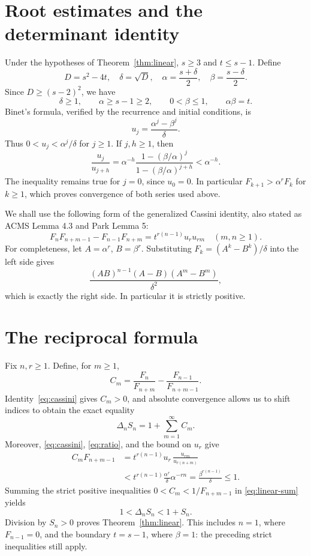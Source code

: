 \documentclass[11pt]{article}
\begin{document}
\section*{Root estimates and the determinant identity}
Under the hypotheses of Theorem~\ref{thm:linear}, $s\geq3$ and
$t\leq s-1$. Define
\[
D=s^2-4t,\quad \delta=\sqrt D,\quad
\alpha=\frac{s+\delta}{2},\quad \beta=\frac{s-\delta}{2}.
\]
Since $D\geq(s-2)^2$, we have
\[
\delta\geq1,\qquad \alpha\geq s-1\geq2,\qquad
0<\beta\leq1,\qquad \alpha\beta=t.
\]
Binet's formula, verified by the recurrence and initial conditions, is
\[
u_j=\frac{\alpha^j-\beta^j}{\delta}.
\]
Thus $0<u_j<\alpha^j/\delta$ for $j\geq1$. If $j,h\geq1$, then
\begin{equation}\label{eq:ratio}
\frac{u_j}{u_{j+h}}
=\alpha^{-h}\frac{1-(\beta/\alpha)^j}
 {1-(\beta/\alpha)^{j+h}}<\alpha^{-h}.
\end{equation}
The inequality remains true for $j=0$, since $u_0=0$.
In particular $F_{k+1}>\alpha^r F_k$ for $k\geq1$,
which proves convergence of both series used above.

We shall use the following form of the generalized Cassini identity,
also stated as ACMS Lemma 4.3 and Park Lemma 5:
\begin{equation}\label{eq:cassini}
F_nF_{n+m-1}-F_{n-1}F_{n+m}
=t^{r(n-1)}u_r u_{rm}\quad(m,n\geq1).
\end{equation}
For completeness, let $A=\alpha^r$, $B=\beta^r$. Substituting
$F_k=(A^k-B^k)/\delta$ into the left side gives
\[
\frac{(AB)^{n-1}(A-B)(A^m-B^m)}{\delta^2},
\]
which is exactly the right side. In particular it is strictly positive.

\section*{The reciprocal formula}
Fix $n,r\geq1$. Define, for $m\geq1$,
\[
C_m=\frac{F_n}{F_{n+m}}-\frac{F_{n-1}}{F_{n+m-1}}.
\]
Identity~\eqref{eq:cassini} gives $C_m>0$, and absolute convergence
allows us to shift indices to obtain the exact equality
\begin{equation}\label{eq:linear-sum}
\Delta_n S_n=1+\sum_{m=1}^{\infty}C_m .
\end{equation}
Moreover, \eqref{eq:cassini}, \eqref{eq:ratio}, and the bound on $u_r$
give
\begin{align*}
C_mF_{n+m-1}
&=t^{r(n-1)}u_r\,\frac{u_{rm}}{u_{r(n+m)}}\\
&<t^{r(n-1)}\frac{\alpha^r}{\delta}\alpha^{-rn}
=\frac{\beta^{r(n-1)}}{\delta}\leq1.
\end{align*}
Summing the strict positive inequalities
$0<C_m<1/F_{n+m-1}$ in \eqref{eq:linear-sum} yields
\[
1<\Delta_n S_n<1+S_n.
\]
Division by $S_n>0$ proves Theorem~\ref{thm:linear}. This includes
$n=1$, where $F_{n-1}=0$, and the boundary $t=s-1$, where $\beta=1$:
the preceding strict inequalities still apply.
\end{document}

